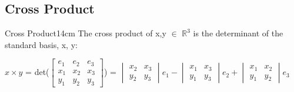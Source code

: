     \newpage




\subsection{ Cross Product }

    \begin{definition}{Cross Product}{14cm}
        The {\color{lblue} cross product} of x,y $\in$ $\mathbb{R}^3$
        is the determinant of the standard basis, x, y:

        \hspace{0.5cm}
        $x \times y$ =
        det($
        \begin{bmatrix}
            e_1 & e_2 & e_3 \\
            x_1 & x_2 & x_3 \\
            y_1 & y_2 & y_3 
        \end{bmatrix}$)
        =
        $\begin{vmatrix}
            x_2 & x_3 \\
            y_2 & y_3 
        \end{vmatrix}e_1
        - \begin{vmatrix}
            x_1 & x_3 \\
            y_1 & y_3 
        \end{vmatrix}e_2
        + \begin{vmatrix}
            x_1 & x_2 \\
            y_1 & y_2 
        \end{vmatrix}e_3$
    \end{definition}

    \vspace{0.5cm}




